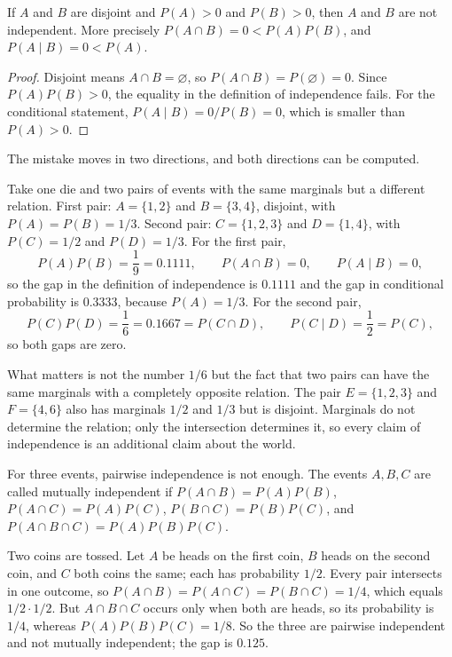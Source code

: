 \begin{proposisi}
If $A$ and $B$ are disjoint and $P(A)>0$ and $P(B)>0$, then $A$ and $B$ are not
independent. More precisely $P(A\cap B)=0<P(A)P(B)$, and $P(A\mid B)=0<P(A)$.
\end{proposisi}

\begin{proof}
Disjoint means $A\cap B=\varnothing$, so $P(A\cap B)=P(\varnothing)=0$. Since
$P(A)P(B)>0$, the equality in the definition of independence fails. For the conditional
statement, $P(A\mid B)=0/P(B)=0$, which is smaller than $P(A)>0$.
\end{proof}

The mistake moves in two directions, and both directions can be computed.

Take one die and two pairs of events with the same marginals but a different relation. First
pair: $A=\{1,2\}$ and $B=\{3,4\}$, disjoint, with $P(A)=P(B)=1/3$. Second pair:
$C=\{1,2,3\}$ and $D=\{1,4\}$, with $P(C)=1/2$ and $P(D)=1/3$. For the first pair,
\[
P(A)P(B)=\frac{1}{9}=0.1111,\qquad P(A\cap B)=0,\qquad P(A\mid B)=0,
\]
so the gap in the definition of independence is $0.1111$ and the gap in conditional
probability is $0.3333$, because $P(A)=1/3$. For the second pair,
\[
P(C)P(D)=\frac{1}{6}=0.1667=P(C\cap D),\qquad P(C\mid D)=\frac{1}{2}=P(C),
\]
so both gaps are zero.

What matters is not the number $1/6$ but the fact that two pairs can have the same marginals
with a completely opposite relation. The pair $E=\{1,2,3\}$ and $F=\{4,6\}$ also has
marginals $1/2$ and $1/3$ but is disjoint. Marginals do not determine the relation; only the
intersection determines it, so every claim of independence is an additional claim about the
world.

For three events, pairwise independence is not enough. The events $A,B,C$ are called
mutually independent if $P(A\cap B)=P(A)P(B)$, $P(A\cap C)=P(A)P(C)$,
$P(B\cap C)=P(B)P(C)$, and $P(A\cap B\cap C)=P(A)P(B)P(C)$.

\begin{contoh}
Two coins are tossed. Let $A$ be heads on the first coin, $B$ heads on the second coin, and
$C$ both coins the same; each has probability $1/2$. Every
pair intersects in one outcome, so $P(A\cap B)=P(A\cap C)=P(B\cap C)=1/4$, which equals
$1/2\cdot 1/2$. But $A\cap B\cap C$ occurs only when both are heads,
so its probability is $1/4$, whereas $P(A)P(B)P(C)=1/8$. So the three are pairwise
independent and not mutually independent; the gap is $0.125$.
\end{contoh}

